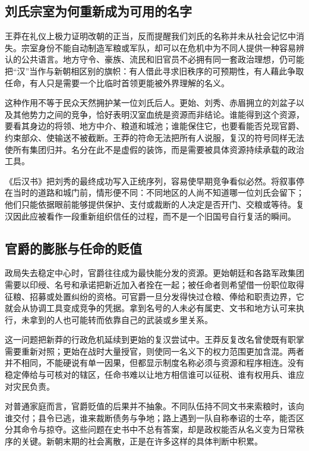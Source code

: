 \subsection{刘氏宗室为何重新成为可用的名字}

王莽在礼仪上极力证明改朝的正当，反而提醒我们刘氏的名称并未从社会记忆中消失。宗室身份不能自动制造军粮或军队，却可以在危机中为不同人提供一种容易辨认的公共语言。地方守令、豪族、流民和旧官员不必拥有同一套政治理想，仍可能把“汉”当作与新朝相区别的旗帜：有人借此寻求旧秩序的可预期性，有人藉此争取任命，有人只是需要一个比临时首领更能被外界理解的名义。

这种作用不等于民众天然拥护某一位刘氏后人。更始、刘秀、赤眉拥立的刘盆子以及其他势力之间的竞争，恰好表明汉室血统是资源而非结论。谁能得到这个资源，要看其身边的将领、地方中介、粮道和城池；谁能保住它，也要看能否兑现官爵、约束部众、使输送不被截断。王莽的符命无法把所有人说服，复汉的符号同样无法使所有集团归并。名分在此不是虚假的装饰，而是需要被具体资源持续承载的政治工具。

《后汉书》把刘秀的最终成功写入正统序列，容易使早期竞争看似必然。将叙事停在当时的道路和城门前，情形便不同：不同地区的人尚不知道哪一位刘氏会留下；他们只能依据眼前能够提供保护、支付或裁断的人决定是否开门、交粮或等待。复汉因此应被看作一段重新组织信任的过程，而不是一个旧国号自行复活的瞬间。

\subsection{官爵的膨胀与任命的贬值}

政局失去稳定中心时，官爵往往成为最快能分发的资源。更始朝廷和各路军政集团需要以印绶、名号和承诺把新近加入者拴在一起；被任命者则希望借一份职位取得征粮、招募或处置纠纷的资格。可官爵一旦分发得快过仓粮、俸给和职责边界，它就会从协调工具变成竞争的凭据。拿到名号的人未必有属吏、文书和地方认可来执行，未拿到的人也可能转而依靠自己的武装或乡里关系。

这一问题把新莽的行政危机延续到更始的复汉尝试中。王莽反复改名曾使既有职掌需要重新对照；更始在战时大量授官，则使同一名义下的权力范围更加含混。两者并不相同，不能硬说有单一因果，但都显示制度名称必须与资源和程序相连。没有稳定俸给与可核对的辖区，任命书难以让地方相信谁可以征税、谁有权用兵、谁应对灾民负责。

对普通家庭而言，官爵贬值的后果并不抽象。不同队伍持不同文书来索粮时，该向谁交付；县令已逃，谁来裁断债务与争地；路上遇到一队自称奉诏的士卒，能否区分其命令与掠夺。这些问题在史书中不总有答案，却是政权能否从名义变为日常秩序的关键。新朝末期的社会离散，正是在许多这样的具体判断中积累。

